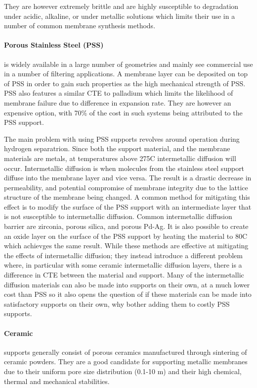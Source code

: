 They are however extremely brittle and are highly susceptible to degradation under acidic, alkaline, or under metallic solutions which limits their use in a number of common membrane synthesis methods. \cite{MUKHERJEE2007107}

\paragraph*{Porous Stainless Steel (PSS)} is widely available in a large number of geometries and mainly see commercial use in a number of filtering applications. A membrane layer can be deposited on top of PSS in order to gain such properties as the high mechanical strength of PSS. PSS also features a similar CTE to palladium which limits the likelihood of membrane failure due to difference in expansion rate.  They are however an expensive option, with 70\% of the cost in such systems being attributed to the PSS support.

The main problem with using PSS supports revolves around operation during hydrogen separatrion. Since both the support material, and the membrane materials are metals, at temperatures above 275\textdegree C intermetallic diffusion will occur. Intermetallic diffusion is when molecules from the stainless steel support diffuse into the membrane layer and vice versa. The result is a drastic decrease in permeability, and potential compromise of membrane integrity due to the lattice structure of the membrane being changed. A common method for mitigating this effect is to modify the surface of the PSS support with an intermediate layer that is not susceptible to intermetallic diffusion. Common intermetallic diffusion barrier are zirconia, porous silica, and porous Pd-Ag.  \cite{Atsonios2015} It is also possible to create an oxide layer on the surface of the PSS support by heating the material to 80\textdegree C which achievges the same result. While these methods are effective at mitigating the effects of intermetallic diffusion; they instead introduce a different problem where, in particular with some ceramic intermetallic diffusion layers, there is a difference in CTE between the material and support. Many of the intermetallic diffusion materials can also be made into supports on their own, at a much lower cost than PSS so it also opens the question of if these materials can be made into satisfactory supports on their own, why bother adding them to costly PSS supports.

\paragraph*{Ceramic} supports generally consist of porous ceramics manufactured through sintering of ceramic powders. They are a good candidate for supporting metallic membranes due to their uniform pore size distribution (0.1-10 \textmu m) and their high chemical, thermal and mechanical stabilities. 

